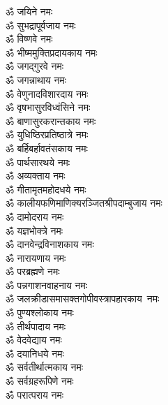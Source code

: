 \begin{multicols}{2}
\begin{flushleft}
ॐ जयिने नमः\hfill{}\\
ॐ सुभद्रापूर्वजाय नमः\\
ॐ विष्णवे नमः\\
ॐ भीष्ममुक्तिप्रदायकाय नमः\\
ॐ जगद्गुरवे नमः\\
ॐ जगन्नाथाय नमः\\
ॐ वेणुनादविशारदाय नमः\\
ॐ वृषभासुरविध्वंसिने नमः\\
ॐ बाणासुरकरान्तकाय नमः\\
ॐ युधिष्ठिरप्रतिष्ठात्रे नमः\\
ॐ बर्हिबर्हावतंसकाय नमः\hfill{}\\
ॐ पार्थसारथये नमः\\
ॐ अव्यक्ताय नमः\\
ॐ गीतामृतमहोदधये नमः\\
ॐ कालीयफणिमाणिक्य\-रञ्जित\-श्री\-पदाम्बुजाय नमः\\
ॐ दामोदराय नमः\\
ॐ यज्ञभोक्त्रे नमः\\
ॐ दानवेन्द्रविनाशकाय नमः\\
ॐ नारायणाय नमः\\
ॐ परब्रह्मणे नमः\\
ॐ पन्नगाशनवाहनाय नमः\hfill{}\\
ॐ जलक्रीडासमासक्त\-गोपी\-वस्त्रापहारकाय~नमः\\
ॐ पुण्यश्लोकाय नमः\\
ॐ तीर्थपादाय नमः\\
ॐ वेदवेद्याय नमः\\
ॐ दयानिधये नमः\\
ॐ सर्वतीर्थात्मकाय नमः\\
ॐ सर्वग्रहरूपिणे नमः\\
ॐ परात्पराय नमः\hfill{}\\
\end{flushleft}
\end{multicols}


